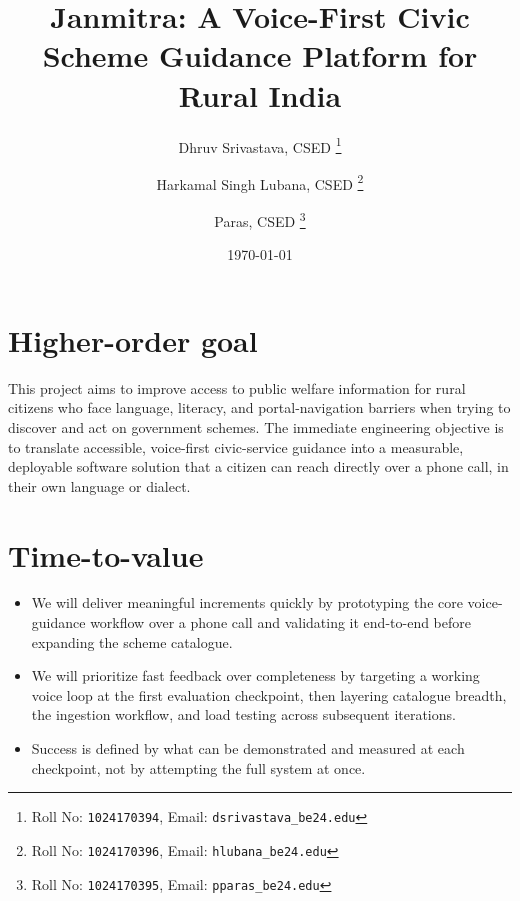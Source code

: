 \documentclass[11pt,a4paper]{article}
\title{Janmitra: A Voice-First Civic Scheme Guidance Platform for Rural India}
\author{
  Dhruv Srivastava, CSED%
  \thanks{Roll No: \texttt{1024170394}, %
    Email: \texttt{dsrivastava\_be24\@thapar.edu}}
  \and
  Harkamal Singh Lubana, CSED%
  \thanks{Roll No: \texttt{1024170396}, %
    Email: \texttt{hlubana\_be24\@thapar.edu}}
  \and
  Paras, CSED%
  \thanks{Roll No: \texttt{1024170395}, %
    Email: \texttt{pparas\_be24\@thapar.edu}}
}
\date{\today}
\begin{document}
\maketitle

\section{Higher-order goal}
This project aims to improve access to public welfare information for rural citizens who face language, literacy, and portal-navigation barriers when trying to discover and act on government schemes. The immediate engineering objective is to translate accessible, voice-first civic-service guidance into a measurable, deployable software solution that a citizen can reach directly over a phone call, in their own language or dialect.

\section{Time-to-value}
\begin{itemize}[leftmargin=0.7cm]
    \item We will deliver meaningful increments quickly by prototyping the core voice-guidance workflow over a phone call and validating it end-to-end before expanding the scheme catalogue.
    \item We will prioritize fast feedback over completeness by targeting a working voice loop at the first evaluation checkpoint, then layering catalogue breadth, the ingestion workflow, and load testing across subsequent iterations.
    \item Success is defined by what can be demonstrated and measured at each checkpoint, not by attempting the full system at once.
\end{itemize}
\end{document}
